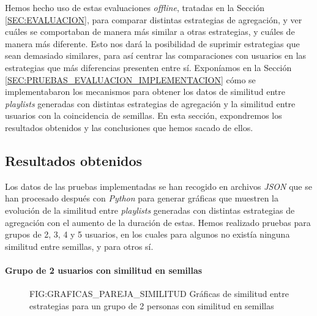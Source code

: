 Hemos hecho uso de estas evaluaciones \textit{offline}, tratadas en la Sección \ref{SEC:EVALUACION}, 
 para comparar distintas estrategias de agregación, y ver cuáles se comportaban de manera más similar a otras estrategias, y 
 cuáles de manera más diferente. Esto nos dará la posibilidad de suprimir
estrategias que sean demasiado similares, para así centrar las comparaciones con usuarios en las estrategias que más diferencias presenten entre sí.
Exponíamos en la Sección \ref{SEC:PRUEBAS_EVALUACION_IMPLEMENTACION} cómo se implementabaron los mecanismos para obtener los datos de similitud entre \textit{playlists} generadas 
con distintas estrategias de agregación y la similitud entre usuarios con la coincidencia de semillas. En esta sección, expondremos los resultados obtenidos y las conclusiones 
que hemos sacado de ellos.

\subsection{Resultados obtenidos\label{SEC:RESULTADOS_OBTENIDOS}}

Los datos de las pruebas implementadas se han recogido en archivos \textit{JSON} que se han procesado después con \textit{Python} para generar gráficas que muestren la evolución 
de la similitud entre \textit{playlists} generadas con distintas estrategias de agregación con el aumento de la duración de estas. Hemos realizado pruebas para grupos de 
2, 3, 4 y 5 usuarios, en los cuales para algunos no existía ninguna similitud entre semillas, y para otros sí. 

\paragraph{Grupo de 2 usuarios con similitud en semillas}

\begin{figure}[Gráficas de similitud entre estrategias para un grupo de 2 personas con similitud en semillas]{FIG:GRAFICAS_PAREJA_SIMILITUD}
    {Gráficas de similitud entre estrategias para un grupo de 2 personas con similitud en semillas}
\end{figure}

